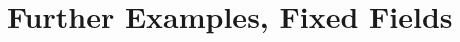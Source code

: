 \documentclass[a4paper]{article}
\begin{document}
\section{Further Examples, Fixed Fields}
\end{document}
